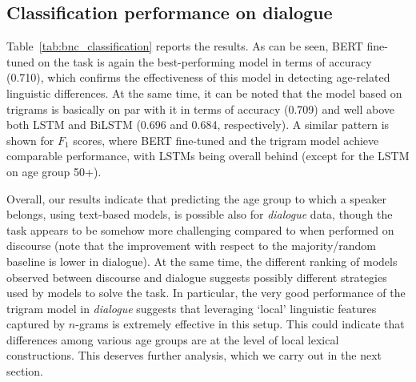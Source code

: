 \subsection{Classification performance on dialogue}
Table~\ref{tab:bnc_classification} reports the results. As can be seen, BERT fine-tuned on the task is again the best-performing model in terms of accuracy (0.710), which confirms the effectiveness of this model in detecting age-related linguistic differences. At the same time, it can be noted that the model based on trigrams is basically on par with it in terms of accuracy (0.709) and well above both LSTM and BiLSTM (0.696 and 0.684, respectively). A similar pattern is shown for $F_1$ scores, where BERT fine-tuned and the trigram model achieve comparable performance, with LSTMs being overall behind (except for the LSTM on age group 50+). 

Overall, our results indicate that predicting the age group to which a speaker belongs, using text-based models, is possible also for \emph{dialogue} data, though the task appears to be somehow more challenging compared to when performed on discourse 
(note that the improvement with respect to the majority/random baseline is lower in dialogue). 
At the same time, the different ranking of models observed between discourse and dialogue suggests possibly different strategies used by models to solve the task. In particular, the very good performance of the trigram model in \emph{dialogue} suggests that leveraging `local' linguistic features captured by $n$-grams is extremely effective in this setup. This could indicate that differences among various age groups are at the level of
local lexical constructions.
This deserves further analysis, which we carry out in the next section.



